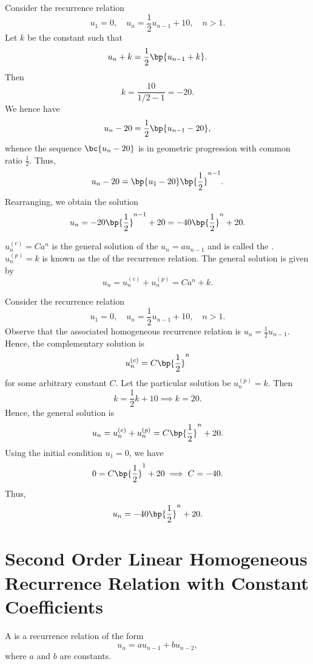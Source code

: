 \begin{example}[Solving by GP]
    Consider the recurrence relation \[u_1 = 0, \quad u_n = \frac12 u_{n-1} + 10, \quad n > 1.\] Let $k$ be the constant such that \[u_n + k = \frac12 \bp{u_{n-1} + k}.\] Then \[k = \frac{10}{1/2 - 1} = -20.\] We hence have \[u_n - 20 = \frac12 \bp{u_{n-1} - 20},\] whence the sequence $\bc{u_n - 20}$ is in geometric progression with common ratio $\frac12$. Thus, \[u_n - 20 = \bp{u_1 - 20} \bp{\frac12}^{n-1}.\] Rearranging, we obtain the solution \[u_n = -20 \bp{\frac12}^{n-1} + 20 = -40 \bp{\frac12}^n + 20.\]
\end{example}

\begin{fact}
    $u_n^{(c)} = Ca^n$ is the general solution of the  $u_n = au_{n-1}$ and is called the . $u_n^{(p)} = k$ is known as the  of the recurrence relation. The general solution is given by \[u_n = u_n^{(c)} + u_n^{(p)} = Ca^n + k.\]
\end{fact}

\begin{example}
    Consider the recurrence relation \[u_1 = 0, \quad u_n = \frac12 u_{n-1} + 10, \quad n > 1.\] Observe that the associated homogeneous recurrence relation is $u_n = \frac12 u_{n-1}$. Hence, the complementary solution is \[u_n^{(c)} = C\bp{\frac12}^n\] for some arbitrary constant $C$. Let the particular solution be $u_n^{(p)} = k$. Then \[k = \frac12 k + 10 \implies k = 20.\] Hence, the general solution is \[u_n = u_n^{(c)} + u_n^{(p)} = C\bp{\frac12}^n + 20.\] Using the initial condition $u_1 = 0$, we have \[0 = C\bp{\frac12}^1 + 20 \implies C = -40.\] Thus, \[u_n =-40\bp{\frac12}^n + 20.\]
\end{example}

\section{Second Order Linear Homogeneous Recurrence Relation with Constant Coefficients}

\begin{definition}
    A  is a recurrence relation of the form \[u_n = a u_{n-1} + b u_{n-2},\] where $a$ and $b$ are constants.
\end{definition}

